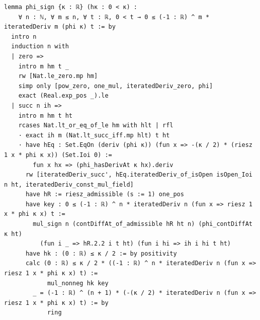 \begin{Verbatim}[fontsize=\scriptsize,frame=single,framesep=1.5mm]
lemma phi_sign {κ : ℝ} (hκ : 0 < κ) :
    ∀ n : ℕ, ∀ m ≤ n, ∀ t : ℝ, 0 < t → 0 ≤ (-1 : ℝ) ^ m * iteratedDeriv m (phi κ) t := by
  intro n
  induction n with
  | zero =>
    intro m hm t _
    rw [Nat.le_zero.mp hm]
    simp only [pow_zero, one_mul, iteratedDeriv_zero, phi]
    exact (Real.exp_pos _).le
  | succ n ih =>
    intro m hm t ht
    rcases Nat.lt_or_eq_of_le hm with hlt | rfl
    · exact ih m (Nat.lt_succ_iff.mp hlt) t ht
    · have hEq : Set.EqOn (deriv (phi κ)) (fun x => -(κ / 2) * (riesz 1 x * phi κ x)) (Set.Ioi 0) :=
        fun x hx => (phi_hasDerivAt κ hx).deriv
      rw [iteratedDeriv_succ', hEq.iteratedDeriv_of_isOpen isOpen_Ioi n ht, iteratedDeriv_const_mul_field]
      have hR := riesz_admissible (s := 1) one_pos
      have key : 0 ≤ (-1 : ℝ) ^ n * iteratedDeriv n (fun x => riesz 1 x * phi κ x) t :=
        mul_sign n (contDiffAt_of_admissible hR ht n) (phi_contDiffAt κ ht)
          (fun i _ => hR.2.2 i t ht) (fun i hi => ih i hi t ht)
      have hk : (0 : ℝ) ≤ κ / 2 := by positivity
      calc (0 : ℝ) ≤ κ / 2 * ((-1 : ℝ) ^ n * iteratedDeriv n (fun x => riesz 1 x * phi κ x) t) :=
            mul_nonneg hk key
        _ = (-1 : ℝ) ^ (n + 1) * (-(κ / 2) * iteratedDeriv n (fun x => riesz 1 x * phi κ x) t) := by
            ring
\end{Verbatim}
